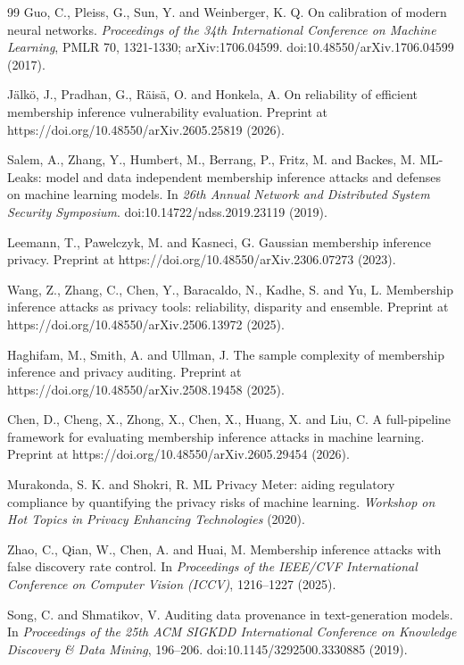 \documentclass[
  10pt,
  twocolumn]{article}
\begin{document}
\begin{thebibliography}{99}
Guo, C., Pleiss, G., Sun, Y. and Weinberger, K. Q.
On calibration of modern neural networks.
\emph{Proceedings of the 34th International Conference on Machine Learning}, PMLR 70, 1321-1330; arXiv:1706.04599.
doi:10.48550/arXiv.1706.04599 (2017).

Jälkö, J., Pradhan, G., Räisä, O. and Honkela, A.
On reliability of efficient membership inference vulnerability evaluation.
Preprint at https://doi.org/10.48550/\allowbreak{}arXiv.2605.25819 (2026).

Salem, A., Zhang, Y., Humbert, M., Berrang, P., Fritz, M. and Backes, M.
ML-Leaks: model and data independent membership inference attacks and defenses on machine learning models.
In \emph{26th Annual Network and Distributed System Security Symposium}.
doi:10.14722/ndss.2019.23119 (2019).

Leemann, T., Pawelczyk, M. and Kasneci, G.
Gaussian membership inference privacy.
Preprint at https://doi.org/10.48550/\allowbreak{}arXiv.2306.07273 (2023).

Wang, Z., Zhang, C., Chen, Y., Baracaldo, N., Kadhe, S. and Yu, L.
Membership inference attacks as privacy tools: reliability, disparity and ensemble.
Preprint at https://doi.org/10.48550/\allowbreak{}arXiv.2506.13972 (2025).

Haghifam, M., Smith, A. and Ullman, J.
The sample complexity of membership inference and privacy auditing.
Preprint at https://doi.org/10.48550/\allowbreak{}arXiv.2508.19458 (2025).

Chen, D., Cheng, X., Zhong, X., Chen, X., Huang, X. and Liu, C.
A full-pipeline framework for evaluating membership inference attacks in machine learning.
Preprint at https://doi.org/10.48550/\allowbreak{}arXiv.2605.29454 (2026).

Murakonda, S. K. and Shokri, R.
ML Privacy Meter: aiding regulatory compliance by quantifying the privacy risks of machine learning.
\emph{Workshop on Hot Topics in Privacy Enhancing Technologies} (2020).

Zhao, C., Qian, W., Chen, A. and Huai, M.
Membership inference attacks with false discovery rate control.
In \emph{Proceedings of the IEEE/CVF International Conference on Computer Vision (ICCV)}, 1216--1227 (2025).

Song, C. and Shmatikov, V.
Auditing data provenance in text-generation models.
In \emph{Proceedings of the 25th ACM SIGKDD International Conference on Knowledge Discovery \& Data Mining}, 196--206.
doi:10.1145/3292500.3330885 (2019).


\end{thebibliography}
\end{document}

